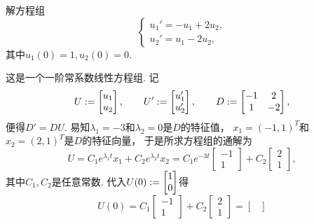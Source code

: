 \begin{example}
解方程组\begin{equation*}
	\begin{cases}
		u_1' = -u_1 + 2u_2, \\
		u_2' = u_1 - 2u_2,
	\end{cases}
\end{equation*}
其中\(
	u_1(0) = 1,
	u_2(0) = 0
\).
\begin{solution}
这是一个一阶常系数线性方程组.
记\begin{equation*}
	U := \begin{bmatrix}
		u_1 \\ u_2
	\end{bmatrix},
	\qquad
	U' := \begin{bmatrix}
		u_1' \\ u_2'
	\end{bmatrix},
	\qquad
	D := \begin{bmatrix}
		-1 & 2 \\
		1 & -2
	\end{bmatrix},
\end{equation*}
便得\(D' = D U\).
易知\(\lambda_1=-3\)和\(\lambda_2=0\)是\(D\)的特征值，
\(x_1=(-1,1)^T\)和\(x_2=(2,1)^T\)是\(D\)的特征向量，
于是所求方程组的通解为\begin{equation*}
	U = C_1 e^{\lambda_1 t} x_1 + C_2 e^{\lambda_2 t} x_2
	= C_1 e^{-3t} \begin{bmatrix}
		-1 \\ 1
	\end{bmatrix}
	+ C_2 \begin{bmatrix}
		2 \\ 1
	\end{bmatrix},
\end{equation*}
其中\(C_1,C_2\)是任意常数.
代入\(
	U(0) := \begin{bmatrix}
		1 \\ 0
	\end{bmatrix}
\)得\begin{equation*}
	U(0)
	= C_1 \begin{bmatrix}
		-1 \\ 1
	\end{bmatrix}
	+ C_2 \begin{bmatrix}
		2 \\ 1
	\end{bmatrix}
	= \begin{bmatrix}

\end{bmatrix}
\end{equation*}
\end{solution}
\end{example}
